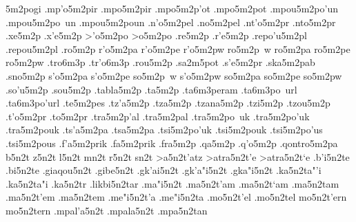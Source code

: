 {5m2pogi      %
.mp'o5m2pir  %
.mpo5m2pir   %
.mpo5m2p'ot  %
.mpo5m2pot
.mpou5m2po'un %
.mpou5m2po~un 
.mpou5m2poun 
.n'o5m2pel   %
.no5m2pel    
.nt'o5m2pr   %
.nto5m2pr
.xe5m2p      %
.x'e5m2p
>'o5m2po     %
>o5m2po
.re5m2p      %
.r'e5m2p     %
.repo'u5m2pl %
.repou5m2pl  %
.ro5m2p      %
r'o5m2pa     %
r'o5m2pe
r'o5m2pw
ro5m2p~w
ro5m2pa
ro5m2pe
ro5m2pw
  .tro6m3p	 %
  .tr'o6m3p      %
.rou5m2p     %
.sa2m5pot    %
.s'e5m2pr    %
.ska5m2pab   %
.sno5m2p     %
s'o5m2pa     %
s'o5m2pe
so5m2p~w
s'o5m2pw
so5m2pa
so5m2pe
so5m2pw
.so'u5m2p    %
.sou5m2p
.tabla5m2p   %
.ta5m2p      %
  .ta6m3peram  %
  .ta6m3po~url %
  .ta6m3po'url
.te5m2pes    %
.tz'a5m2p    %
.tza5m2p
.tzana5m2p   %
.tzi5m2p     %
.tzou5m2p    %
.t'o5m2pr    %
.to5m2pr
.tra5m2p'al  %
.tra5m2pal
.tra5m2po~uk %
.tra5m2po'uk
.tra5m2pouk
.ts'a5m2pa   %
.tsa5m2pa
.tsi5m2po'uk %
.tsi5m2pouk
.tsi5m2po'us %
.tsi5m2pous
.f'a5m2prik  %
.fa5m2prik
.fra5m2p     %
.qa5m2p      %
.q'o5m2p     %
.qontro5m2pa %
b5n2t
z5n2t
l5n2t
mn2t
r5n2t
sn2t
>a5n2t'atz   %
>atra5n2t'e  %
>atra5n2t`e
.b'i5n2te    %
.bi5n2te
.giaqou5n2t  %
.gibe5n2t    %
.gk'ai5n2t   %
.gk'a"i5n2t
.gka"i5n2t
.ka5n2ta"'i  %
.ka5n2ta"i
.ka5n2tr     %
.likbi5n2tar %
.ma"i5n2t    %
.ma5n2t'am   %
.ma5n2t`am
.ma5n2tam
.ma5n2t'em   %
.ma5n2tem
.me"i5n2t'a  %
.me"i5n2ta
.mo5n2t'el   %
.mo5n2tel
mo5n2t'ern   %
mo5n2tern
.mpal'a5n2t  %
.mpala5n2t
.mpa5n2tan   %
}
